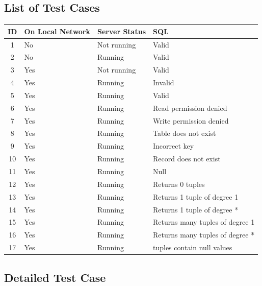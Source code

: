 \documentclass{article}
\begin{document}
\subsection{List of Test Cases}
\begin{center}
  \begin{tabular}{| c | l | l | l |}
    \hline
    ID & On Local Network & Server Status & SQL\\
    \hline
    1 & No & Not running & Valid\\
    2 & No & Running & Valid\\
	3 & Yes & Not running & Valid\\
    4 & Yes & Running & Invalid\\
    5 & Yes & Running & Valid\\
    6 & Yes & Running & Read permission denied\\
    7 & Yes & Running & Write permission denied\\
    8 & Yes & Running & Table does not exist\\
    9 & Yes & Running & Incorrect key\\
    10 & Yes & Running & Record does not exist\\
    11 & Yes & Running & Null\\
    12 & Yes & Running & Returns 0 tuples\\
    13 & Yes & Running & Returns 1 tuple of degree 1\\
    14 & Yes & Running & Returns 1 tuple of degree *\\
    15 & Yes & Running & Returns many tuples of degree 1\\
    16 & Yes & Running & Returns many tuples of degree *\\
    17 & Yes & Running & tuples contain null values\\
    \hline
  \end{tabular}
\end{center}

\subsection{Detailed Test Case}
\end{document}
